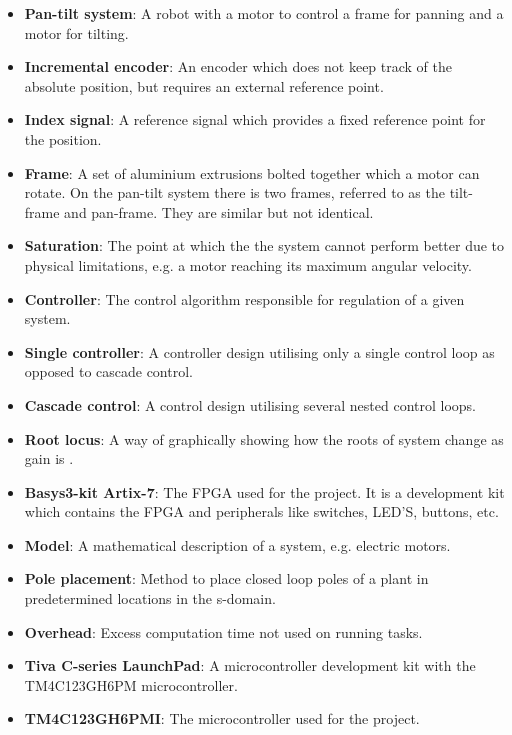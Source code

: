 \documentclass[../../main.tex]{subfiles}
\begin{document}
\label{sec:wordlist}
\begin{itemize}
    \item \textbf{Pan-tilt system}: A robot with a motor to control a frame for panning and a motor for tilting.
    \item \textbf{Incremental encoder}: An encoder which does not keep track of the absolute position, but requires an external reference point.
    \item \textbf{Index signal}: A reference signal which provides a fixed reference point for the position.
    \item \textbf{Frame}: A set of aluminium extrusions bolted together which a motor can rotate. On the pan-tilt system there is two frames, referred to as the tilt-frame and pan-frame. They are similar but not identical.
    \item \textbf{Saturation}: The point at which the the system cannot perform better due to physical limitations, e.g. a motor reaching its maximum angular velocity.
    \item \textbf{Controller}: The control algorithm responsible for regulation of a given system.
    \item \textbf{Single controller}: A controller design utilising only a single control loop as opposed to cascade control.
    \item \textbf{Cascade control}: A control design utilising several nested control loops.
    \item \textbf{Root locus}: A way of graphically showing how the roots of system change as gain is  .
    \item \textbf{Basys3-kit Artix-7}: The FPGA used for the project. It is a development kit which contains the FPGA and peripherals like switches, LED'S, buttons, etc.
    \item \textbf{Model}: A mathematical description of a system, e.g. electric motors. 
    \item \textbf{Pole placement}: Method to place closed loop poles of a plant in predetermined locations in the s-domain.
    \item \textbf{Overhead}: Excess computation time not used on running tasks.
    \item \textbf{Tiva C-series LaunchPad}: A microcontroller development kit with the TM4C123GH6PM microcontroller.
    \item \textbf{TM4C123GH6PMI}: The microcontroller used for the project.
    

\end{itemize}
\end{document}
